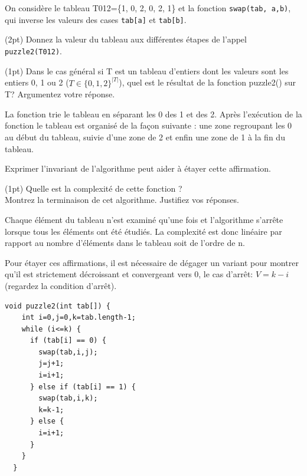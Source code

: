 \documentclass[10pt]{article}\usepackage[nu]{esial}
\begin{document}
\noindent\begin{minipage}{.69\linewidth}

On considère le tableau T012=\{1, 0, 2, 0, 2, 1\} et la fonction
\texttt{swap(tab, a,b)}, qui inverse les valeurs des cases \texttt{tab[a]} et
\texttt{tab[b]}.

\Question(2pt) Donnez la valeur du tableau aux différentes étapes de l'appel
\texttt{puzzle2(T012)}.


\Question(1pt) Dans le cas général si T est un tableau d'entiers dont les
valeurs sont les entiers 0, 1 ou 2 ($T\in \{0,1,2\}^{|T|}$), quel est le
résultat de la fonction puzzle2() sur T?  Argumentez votre réponse.

\begin{Reponse}
  La fonction trie le tableau en séparant les 0 des 1 et des 2. Après
  l'exécution  de la fonction le tableau est organisé de la
  façon suivante : une zone regroupant les 0 au début du tableau,
  suivie d'une zone de 2 et enfin une zone de 1 à  la fin du
  tableau.

  Exprimer l'invariant de l'algorithme peut aider à étayer cette affirmation.
\end{Reponse}

\Question(1pt) Quelle est la complexité de cette fonction ? \\
Montrez la terminaison de cet algorithme. Justifiez vos réponses.
\begin{Reponse}
  Chaque élément du tableau n'est examiné qu'une fois et l'algorithme s'arrête
  lorsque tous les éléments ont été étudiés. La complexité est donc linéaire
  par rapport au nombre d'éléments dans le tableau soit de l'ordre de n. 

  Pour étayer ces affirmations, il est nécessaire de dégager un variant pour
  montrer qu'il est strictement décroissant et convergeant vers 0, le cas
  d'arrêt: $V=k-i$ (regardez la condition d'arrêt).
\end{Reponse}

\end{minipage}\hfill\begin{minipage}{.28\linewidth}
\begin{Verbatim}[gobble=2,numbers=right]
  void puzzle2(int tab[]) {
    int i=0,j=0,k=tab.length-1;
    while (i<=k) {
      if (tab[i] == 0) {
        swap(tab,i,j);
        j=j+1;
        i=i+1;
      } else if (tab[i] == 1) {
        swap(tab,i,k);
        k=k-1;
      } else {
        i=i+1;
      }
    }
  }
\end{Verbatim}


\end{minipage}
\end{document}
